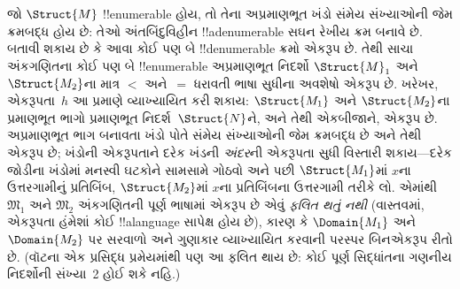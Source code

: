 \documentclass[../../../include/open-logic-section]{subfiles}
\begin{document}
\begin{explain}
જો $\Struct{M}$ !!{enumerable} હોય, તો તેના અપ્રમાણભૂત ખંડો સંમેય
સંખ્યાઓની જેમ ક્રમબદ્ધ હોય છે: તેઓ અંતબિંદુવિહીન !!a{denumerable}
સઘન રેખીય ક્રમ બનાવે છે. બતાવી શકાય છે કે આવા કોઈ પણ બે
!!{denumerable} ક્રમો એકરૂપ છે. તેથી સાચા અંકગણિતના કોઈ પણ બે
!!{enumerable} અપ્રમાણભૂત નિદર્શો $\Struct{M}_1$ અને
$\Struct{M_2}$ના માત્ર $<$ અને~$=$ ધરાવતી ભાષા સુધીના અવશેષો એકરૂપ
છે. ખરેખર, એકરૂપતા~$h$ આ પ્રમાણે વ્યાખ્યાયિત કરી શકાય: $\Struct{M_1}$
અને $\Struct{M_2}$ના પ્રમાણભૂત ભાગો પ્રમાણભૂત નિદર્શ~$\Struct{N}$ને,
અને તેથી એકબીજાને, એકરૂપ છે. અપ્રમાણભૂત ભાગ બનાવતા ખંડો પોતે સંમેય
સંખ્યાઓની જેમ ક્રમબદ્ધ છે અને તેથી એકરૂપ છે; ખંડોની એકરૂપતાને દરેક
ખંડની \emph{અંદર}ની એકરૂપતા સુધી વિસ્તારી શકાય—દરેક જોડીના ખંડોમાં
મનસ્વી ઘટકોને સામસામે ગોઠવો અને પછી $\Struct{M_1}$માં $x$ના
ઉત્તરગામીનું પ્રતિબિંબ, $\Struct{M_2}$માં $x$ના પ્રતિબિંબના ઉત્તરગામી
તરીકે લો. એમાંથી $\mathfrak{M}_1$ અને $\mathfrak{M}_2$ અંકગણિતની
પૂર્ણ ભાષામાં એકરૂપ છે એવું \emph{ફલિત થતું નથી} (વાસ્તવમાં,
એકરૂપતા હંમેશાં કોઈ !!a{language} સાપેક્ષ હોય છે), કારણ કે
$\Domain{M_1}$ અને $\Domain{M_2}$ પર સરવાળો અને ગુણાકાર વ્યાખ્યાયિત
કરવાની પરસ્પર બિનએકરૂપ રીતો છે. (વૉટના એક પ્રસિદ્ધ પ્રમેયમાંથી પણ આ
ફલિત થાય છે: કોઈ પૂર્ણ સિદ્ધાંતના ગણનીય નિદર્શોની સંખ્યા~2 હોઈ શકે
નહિ.)
\end{explain}
\end{document}
